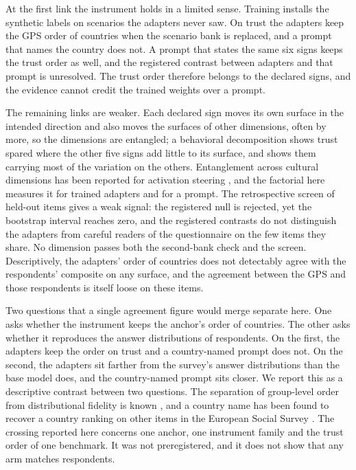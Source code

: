 At the first link the instrument holds in a limited sense. Training installs the synthetic labels on scenarios the adapters never saw. On trust the adapters keep the GPS order of countries when the scenario bank is replaced, and a prompt that names the country does not. A prompt that states the same six signs keeps the trust order as well, and the registered contrast between adapters and that prompt is unresolved. The trust order therefore belongs to the declared signs, and the evidence cannot credit the trained weights over a prompt.

The remaining links are weaker. Each declared sign moves its own surface in the intended direction and also moves the surfaces of other dimensions, often by more, so the dimensions are entangled; a behavioral decomposition shows trust spared where the other five signs add little to its surface, and shows them carrying most of the variation on the others. Entanglement across cultural dimensions has been reported for activation steering \citep{dangmasud2026}, and the factorial here measures it for trained adapters and for a prompt. The retrospective screen of held-out items gives a weak signal: the registered null is rejected, yet the bootstrap interval reaches zero, and the registered contrasts do not distinguish the adapters from careful readers of the questionnaire on the few items they share. No dimension passes both the second-bank check and the screen. Descriptively, the adapters' order of countries does not detectably agree with the respondents' composite on any surface, and the agreement between the GPS and those respondents is itself loose on these items.

Two questions that a single agreement figure would merge separate here. One asks whether the instrument keeps the anchor's order of countries. The other asks whether it reproduces the answer distributions of respondents. On the first, the adapters keep the order on trust and a country-named prompt does not. On the second, the adapters sit farther from the survey's answer distributions than the base model does, and the country-named prompt sits closer. We report this as a descriptive contrast between two questions. The separation of group-level order from distributional fidelity is known \citep{dasilva2026}, and a country name has been found to recover a country ranking on other items in the European Social Survey \citep{wangc2026}. The crossing reported here concerns one anchor, one instrument family and the trust order of one benchmark. It was not preregistered, and it does not show that any arm matches respondents.

